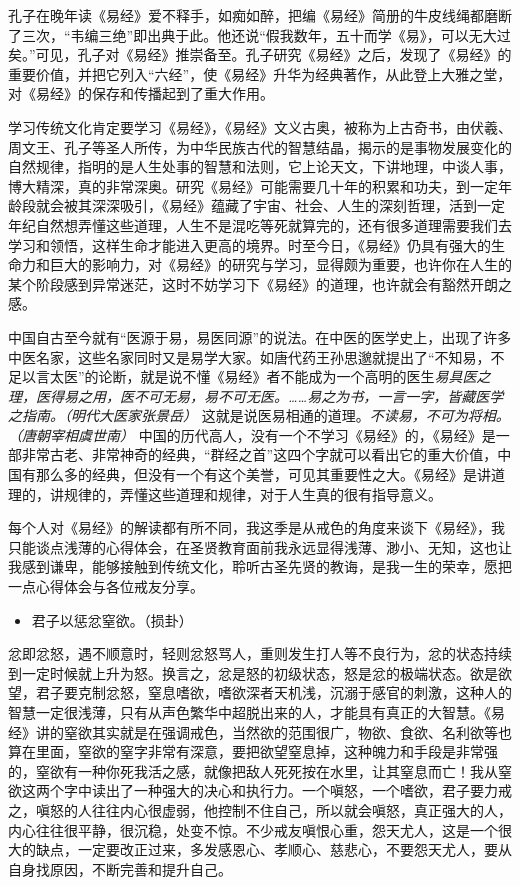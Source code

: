 孔子在晚年读《易经》爱不释手，如痴如醉，把编《易经》简册的牛皮线绳都磨断了三次，“韦编三绝”即出典于此。他还说“假我数年，五十而学《易》，可以无大过矣。”可见，孔子对《易经》推崇备至。孔子研究《易经》之后，发现了《易经》的重要价值，并把它列入“六经”，使《易经》升华为经典著作，从此登上大雅之堂，对《易经》的保存和传播起到了重大作用。

学习传统文化肯定要学习《易经》，《易经》文义古奥，被称为上古奇书，由伏羲、周文王、孔子等圣人所传，为中华民族古代的智慧结晶，揭示的是事物发展变化的自然规律，指明的是人生处事的智慧和法则，它上论天文，下讲地理，中谈人事，博大精深，真的非常深奥。研究《易经》可能需要几十年的积累和功夫，到一定年龄段就会被其深深吸引，《易经》蕴藏了宇宙、社会、人生的深刻哲理，活到一定年纪自然想弄懂这些道理，人生不是混吃等死就算完的，还有很多道理需要我们去学习和领悟，这样生命才能进入更高的境界。时至今日，《易经》仍具有强大的生命力和巨大的影响力，对《易经》的研究与学习，显得颇为重要，也许你在人生的某个阶段感到异常迷茫，这时不妨学习下《易经》的道理，也许就会有豁然开朗之感。

中国自古至今就有“医源于易，易医同源”的说法。在中医的医学史上，出现了许多中医名家，这些名家同时又是易学大家。如唐代药王孙思邈就提出了“不知易，不足以言太医”的论断，就是说不懂《易经》者不能成为一个高明的医生\textit{易具医之理，医得易之用，医不可无易，易不可无医。……易之为书，一言一字，皆藏医学之指南。（明代大医家张景岳）} 这就是说医易相通的道理。\textit{不读易，不可为将相。（唐朝宰相虞世南）} 中国的历代高人，没有一个不学习《易经》的，《易经》是一部非常古老、非常神奇的经典，“群经之首”这四个字就可以看出它的重大价值，中国有那么多的经典，但没有一个有这个美誉，可见其重要性之大。《易经》是讲道理的，讲规律的，弄懂这些道理和规律，对于人生真的很有指导意义。

每个人对《易经》的解读都有所不同，我这季是从戒色的角度来谈下《易经》，我只能谈点浅薄的心得体会，在圣贤教育面前我永远显得浅薄、渺小、无知，这也让我感到谦卑，能够接触到传统文化，聆听古圣先贤的教诲，是我一生的荣幸，愿把一点心得体会与各位戒友分享。

\begin{itemize}\it
    \item 君子以惩忿窒欲。（损卦）
\end{itemize}

忿即忿怒，遇不顺意时，轻则忿怒骂人，重则发生打人等不良行为，忿的状态持续到一定时候就上升为怒。换言之，忿是怒的初级状态，怒是忿的极端状态。欲是欲望，君子要克制忿怒，窒息嗜欲，嗜欲深者天机浅，沉溺于感官的刺激，这种人的智慧一定很浅薄，只有从声色繁华中超脱出来的人，才能具有真正的大智慧。《易经》讲的窒欲其实就是在强调戒色，当然欲的范围很广，物欲、食欲、名利欲等也算在里面，窒欲的窒字非常有深意，要把欲望窒息掉，这种魄力和手段是非常强的，窒欲有一种你死我活之感，就像把敌人死死按在水里，让其窒息而亡！我从窒欲这两个字中读出了一种强大的决心和执行力。一个嗔怒，一个嗜欲，君子要力戒之，嗔怒的人往往内心很虚弱，他控制不住自己，所以就会嗔怒，真正强大的人，内心往往很平静，很沉稳，处变不惊。不少戒友嗔恨心重，怨天尤人，这是一个很大的缺点，一定要改正过来，多发感恩心、孝顺心、慈悲心，不要怨天尤人，要从自身找原因，不断完善和提升自己。

